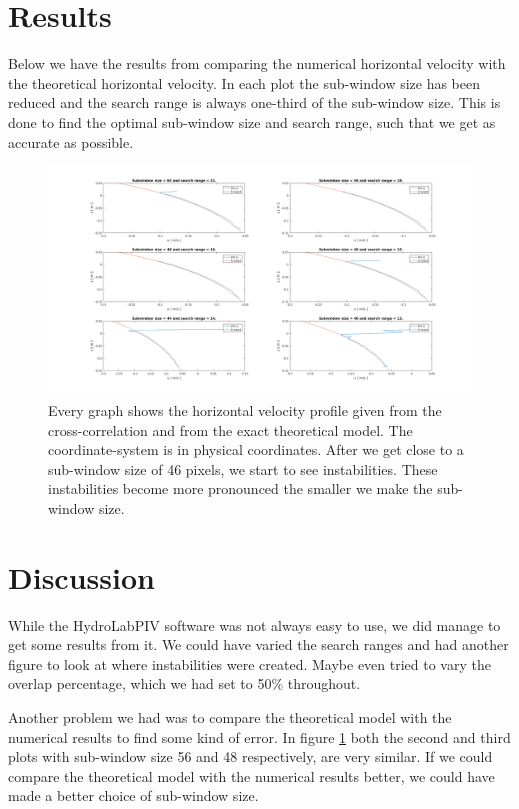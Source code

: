 \documentclass[english,a4paper,12pt]{article}
\begin{document}
\section*{Results}
Below we have the results from comparing the numerical horizontal velocity with the theoretical horizontal velocity. In each plot the sub-window size has been reduced and the search range is always one-third of the sub-window size. This is done to find the optimal sub-window size and search range, such that we get as accurate as possible.

\begin{figure}[H]
    \centering
    \includegraphics[width=180mm]{PIV_U_vs_U_exact.png}
    \caption{Every graph shows the horizontal velocity profile given from the cross-correlation and from the exact theoretical model. The coordinate-system is in physical coordinates. After we get close to a sub-window size of 46 pixels, we start to see instabilities. These instabilities become more pronounced the smaller we make the sub-window size.}
    \label{fig:3}
\end{figure}

\section*{Discussion}
While the HydroLabPIV software was not always easy to use, we did manage to get some results from it. We could have varied the search ranges and had another figure to look at where instabilities were created. Maybe even tried to vary the overlap percentage, which we had set to 50\% throughout. \\\bigskip

Another problem we had was to compare the theoretical model with the numerical results to find some kind of error. In figure \ref{fig:3} both the second and third plots with sub-window size 56 and 48 respectively, are very similar. If we could compare the theoretical model with the numerical results better, we could have made a better choice of sub-window size.
\end{document}
